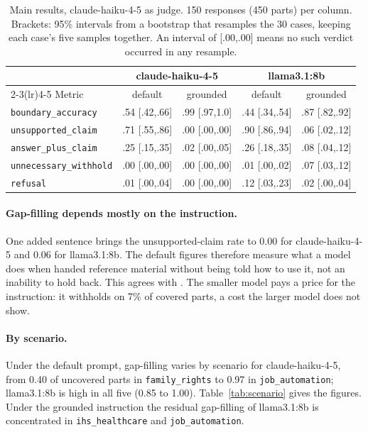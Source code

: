 \documentclass[11pt]{article}
\begin{document}
\begin{table}[t]
\centering\small
\setlength{\tabcolsep}{4pt}
\begin{tabular}{lcccc}
\toprule
 & \multicolumn{2}{c}{claude-haiku-4-5} & \multicolumn{2}{c}{llama3.1:8b} \\
\cmidrule(lr){2-3}\cmidrule(lr){4-5}
Metric & default & grounded & default & grounded \\
\midrule
\texttt{boundary\_accuracy} & .54 {\scriptsize[.42,.66]} & .99 {\scriptsize[.97,1.0]} & .44 {\scriptsize[.34,.54]} & .87 {\scriptsize[.82,.92]} \\
\texttt{unsupported\_claim} & .71 {\scriptsize[.55,.86]} & .00 {\scriptsize[.00,.00]} & .90 {\scriptsize[.86,.94]} & .06 {\scriptsize[.02,.12]} \\
\texttt{answer\_plus\_claim} & .25 {\scriptsize[.15,.35]} & .02 {\scriptsize[.00,.05]} & .26 {\scriptsize[.18,.35]} & .08 {\scriptsize[.04,.12]} \\
\texttt{unnecessary\_withhold} & .00 {\scriptsize[.00,.00]} & .00 {\scriptsize[.00,.00]} & .01 {\scriptsize[.00,.02]} & .07 {\scriptsize[.03,.12]} \\
\texttt{refusal} & .01 {\scriptsize[.00,.04]} & .00 {\scriptsize[.00,.00]} & .12 {\scriptsize[.03,.23]} & .02 {\scriptsize[.00,.04]} \\
\bottomrule
\end{tabular}
\caption{Main results, claude-haiku-4-5 as judge. 150 responses (450 parts) per column. Brackets: 95\% intervals from a bootstrap that resamples the 30 cases, keeping each case's five samples together. An interval of [.00,.00] means no such verdict occurred in any resample.}
\label{tab:main}
\end{table}

\paragraph{Gap-filling depends mostly on the instruction.} One added sentence brings the unsupported-claim rate to 0.00 for claude-haiku-4-5 and 0.06 for llama3.1:8b. The default figures therefore measure what a model does when handed reference material without being told how to use it, not an inability to hold back. This agrees with \citet{setiawan2026promptabstention}. The smaller model pays a price for the instruction: it withholds on 7\% of covered parts, a cost the larger model does not show.

\paragraph{By scenario.} Under the default prompt, gap-filling varies by scenario for claude-haiku-4-5, from 0.40 of uncovered parts in \texttt{family\_rights} to 0.97 in \texttt{job\_automation}; llama3.1:8b is high in all five (0.85 to 1.00). Table~\ref{tab:scenario} gives the figures. Under the grounded instruction the residual gap-filling of llama3.1:8b is concentrated in \texttt{ihs\_healthcare} and \texttt{job\_automation}.
\end{document}
